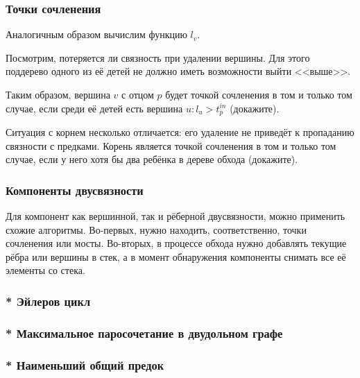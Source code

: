 \documentclass[a4paper,12pt]{article}
\begin{document}
      \subsubsection{Точки сочленения}

      Аналогичным образом вычислим функцию $l_v$.

      Посмотрим, потеряется ли связность при удалении вершины. Для этого
      поддерево одного из её детей не должно иметь возможности выйти
      <<выше>>.

      Таким образом, вершина $v$ с отцом $p$ будет точкой сочленения
      в том и только том случае, если среди её детей есть вершина
      $u: l_u > t^{in}_p$ (докажите).

      Ситуация с корнем несколько отличается: его удаление не приведёт
      к пропаданию связности с предками. Корень является точкой сочленения
      в том и только том случае, если у него хотя бы два ребёнка в дереве
      обхода (докажите).

      \subsubsection{Компоненты двусвязности}

      Для компонент как вершинной, так и рёберной двусвязности, можно
      применить схожие алгоритмы. Во-первых, нужно находить, соответственно,
      точки сочленения или мосты. Во-вторых, в процессе обхода нужно
      добавлять текущие рёбра или вершины в стек, а в момент обнаружения
      компоненты снимать все её элементы со стека.

      \subsubsection{* Эйлеров цикл}

      \subsubsection{* Максимальное паросочетание в двудольном графе}

      \subsubsection{* Наименьший общий предок}
\end{document}
